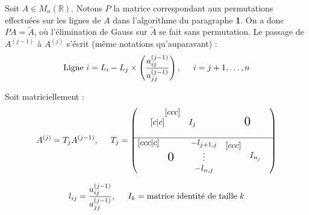\documentclass[a4paper,11pt]{article}
\newcommand{\R}{\mathbb{R}}
\theoremstyle{plain} %
\begin{document}
Soit $A \in M_n(\R)$. Notons $P$ la matrice correspondant aux permutations effectuées sur les lignes de $A$ dans l'algorithme du paragraphe \textbf{1}.
On a donc $PA = \tilde{A}$, où l'élimination de Gauss sur $\tilde{A}$ se fait sans permutation. Le passage de $A^{(j-1)}$ à $A^{(j)}$ s'écrit (même notations qu'auparavant) : 
\[
    \text{Ligne $i$} = L_i - L_j \times \left( \frac{a^{(j-1)}_{ij}}{a^{(j-1)}_{jj}} \right), \hspace{0.5cm} i = j+1, \dots , n
\]

Soit matriciellement :
\[
    A^{(j)} = T_j A^{(j-1)}, \hspace{0.5cm} T_j =
    \begin{pmatrix}[c|c]
        \begin{matrix}[ccc]
        & & \\
        & I_j & \\
        & & \\
        \end{matrix} 
        &
        \begin{matrix}
            \scalebox{1.5}{0}
        \end{matrix}
        \\ \hline
        \begin{matrix}[ccc|c]
            & & & -l_{j+1,j} \\
            & \scalebox{1.5}{0} & & \vdots \\
            & & & -l_{n,j}
        \end{matrix}
        &
        \begin{matrix}[ccc]
        & & \\
        & I_{n_j} & \\
        & & \\
        \end{matrix} 
    \end{pmatrix}
\]

\[
    l_{ij} = \frac{a^{(j-1)}_{ij}}{a^{(j-1)}_{jj}} , \hspace{0.5cm} I_k = \text{matrice identité de taille $k$}
\]
\end{document}
